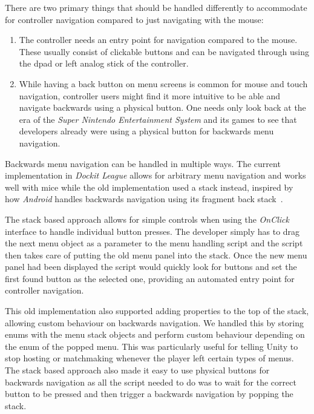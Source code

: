 There are two primary things that should be handled differently to accommodate for controller navigation compared to just navigating with the mouse:
\begin{enumerate}
    \item The controller needs an entry point for navigation compared to the mouse. These usually consist of clickable buttons and can be navigated through using the dpad or left analog stick of the controller. 
    \item While having a back button on menu screens is common for mouse and touch navigation, controller users might find it more intuitive to be able and navigate backwards using a physical button. One needs only look back at the era of the \emph{Super Nintendo Entertainment System} and its games to see that developers already were using a physical button for backwards menu navigation. 
\end{enumerate}

Backwards menu navigation can be handled in multiple ways. The current implementation in \emph{Dockit League} allows for arbitrary menu navigation and works well with mice while the old implementation used a stack instead, inspired by how \emph{Android} handles backwards navigation using its fragment back stack~\cite{androidBackStack}. 

The stack based approach allows for simple controls when using the \emph{OnClick} interface to handle individual button presses. The developer simply has to drag the next menu object as a parameter to the menu handling script and the script then takes care of putting the old menu panel into the stack. Once the new menu panel had been displayed the script would quickly look for buttons and set the first found button as the selected one, providing an automated entry point for controller navigation. 

This old implementation also supported adding properties to the top of the stack, allowing custom behaviour on backwards navigation. We handled this by storing enums with the menu stack objects and perform custom behaviour depending on the enum of the popped menu. This was particularly useful for telling Unity to stop hosting or matchmaking whenever the player left certain types of menus. 
The stack based approach also made it easy to use physical buttons for backwards navigation as all the script needed to do was to wait for the correct button to be pressed and then trigger a backwards navigation by popping the stack. 